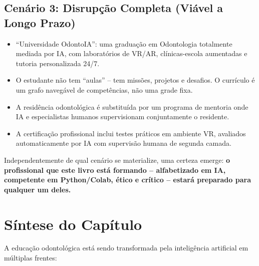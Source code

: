 \subsection{Cenário 3: Disrupção Completa (Viável a Longo Prazo)}

\begin{itemize}
  \item ``Universidade OdontoIA'': uma graduação em Odontologia totalmente
    mediada por IA, com laboratórios de VR/AR, clínicas-escola aumentadas e
    tutoria personalizada 24/7.
  \item O estudante não tem ``aulas'' -- tem missões, projetos e desafios. O
    currículo é um grafo navegável de competências, não uma grade fixa.
  \item A residência odontológica é substituída por um programa de mentoria
    onde IA e especialistas humanos supervisionam conjuntamente o residente.
  \item A certificação profissional inclui testes práticos em ambiente VR,
    avaliados automaticamente por IA com supervisão humana de segunda camada.
\end{itemize}

Independentemente de qual cenário se materialize, uma certeza emerge: \textbf{o
profissional que este livro está formando -- alfabetizado em IA, competente em
Python/Colab, ético e crítico -- estará preparado para qualquer um deles.}

\section{Síntese do Capítulo}

A educação odontológica está sendo transformada pela inteligência artificial em
múltiplas frentes:

